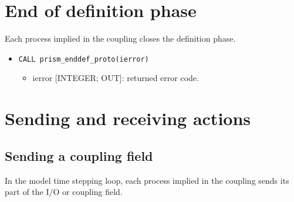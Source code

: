 \section{End of definition phase}
\label{subsubsec_Endofdefinition}
Each process implied in the coupling closes the definition phase.
\begin{itemize}
\item {\tt CALL prism\_enddef\_proto(ierror)}
\begin{itemize}
  \item ierror [INTEGER; OUT]: returned error code.
\end{itemize}
\end{itemize}


\section{Sending and receiving actions}
\label{subsubsec_sendingreceiving}

\subsection{Sending a coupling field}
\label{prismput}

In the model time stepping loop, each process implied in the coupling
sends its part of the I/O or coupling field. 

